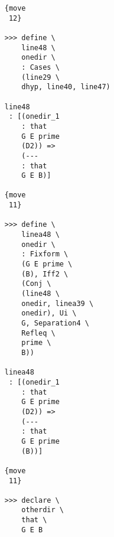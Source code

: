 \documentclass[12pt]{article}
\begin{document}
\begin{verbatim}
                                    {move 
                                     12}

                                    >>> define \
                                        line48 \
                                        onedir \
                                        : Cases \
                                        (line29 \
                                        dhyp, line40, line47)

                                    line48 
                                     : [(onedir_1 
                                        : that 
                                        G E prime 
                                        (D2)) => 
                                        (--- 
                                        : that 
                                        G E B)]

                                    {move 
                                     11}

                                    >>> define \
                                        linea48 \
                                        onedir \
                                        : Fixform \
                                        (G E prime \
                                        (B), Iff2 \
                                        (Conj \
                                        (line48 \
                                        onedir, linea39 \
                                        onedir), Ui \
                                        G, Separation4 \
                                        Refleq \
                                        prime \
                                        B))

                                    linea48 
                                     : [(onedir_1 
                                        : that 
                                        G E prime 
                                        (D2)) => 
                                        (--- 
                                        : that 
                                        G E prime 
                                        (B))]

                                    {move 
                                     11}

                                    >>> declare \
                                        otherdir \
                                        that \
                                        G E B


\end{verbatim}
\end{document}
